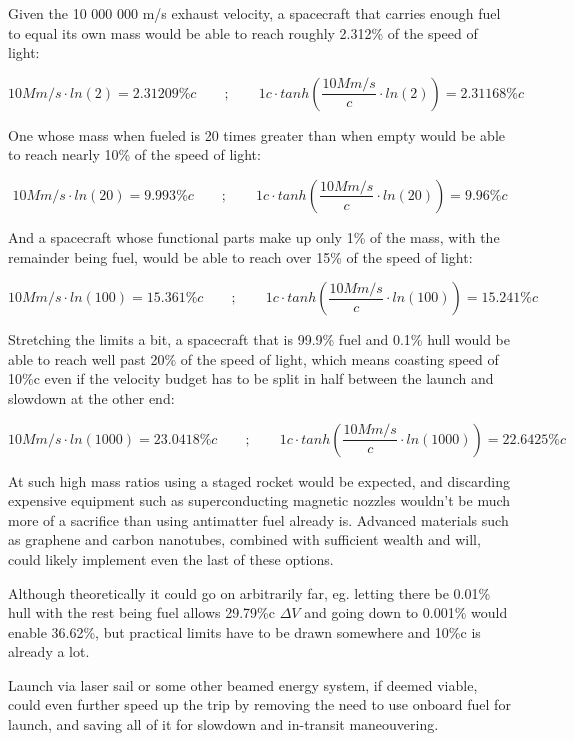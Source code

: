 \documentclass[a4paper]{article}
\begin{document}
    Given the 10 000 000 m/s exhaust velocity, a spacecraft that carries enough fuel to equal its own mass would be able to reach roughly 2.312\% of the speed of light:
    
    $$ 10Mm/s \cdot ln(2) = 2.31209\%c \qquad ; \qquad 1c \cdot tanh\left( \frac{10Mm/s}{c} \cdot ln(2) \right) = 2.31168\%c $$
    
    One whose mass when fueled is 20 times greater than when empty would be able to reach nearly 10\% of the speed of light:
    
    $$ 10Mm/s \cdot ln(20) = 9.993\%c \qquad ; \qquad 1c \cdot tanh\left( \frac{10Mm/s}{c} \cdot ln(20) \right) = 9.96\%c $$
    
    And a spacecraft whose functional parts make up only 1\% of the mass, with the remainder being fuel, would be able to reach over 15\% of the speed of light:
    
    $$ 10Mm/s \cdot ln(100) = 15.361\%c \qquad ; \qquad 1c \cdot tanh\left( \frac{10Mm/s}{c} \cdot ln(100) \right) = 15.241\%c $$
    
    Stretching the limits a bit, a spacecraft that is 99.9\% fuel and 0.1\% hull would be able to reach well past 20\% of the speed of light, which means coasting speed of 10\%c even if the velocity budget has to be split in half between the launch and slowdown at the other end:
    
    $$ 10Mm/s \cdot ln(1000) = 23.0418\%c \qquad ; \qquad 1c \cdot tanh\left( \frac{10Mm/s}{c} \cdot ln(1000) \right) = 22.6425\%c $$
    
    At such high mass ratios using a staged rocket would be expected, and discarding expensive equipment such as superconducting magnetic nozzles wouldn't be much more of a sacrifice than using antimatter fuel already is.
    Advanced materials such as graphene and carbon nanotubes, combined with sufficient wealth and will, could likely implement even the last of these options.
    
    \medskip
    
    Although theoretically it could go on arbitrarily far, eg. letting there be 0.01\% hull with the rest being fuel allows 29.79\%c $\Delta V$ and going down to 0.001\% would enable 36.62\%, but practical limits have to be drawn somewhere and 10\%c is already a lot.
    
    \medskip
    
    Launch via laser sail or some other beamed energy system, if deemed viable, could even further speed up the trip by removing the need to use onboard fuel for launch, and saving all of it for slowdown and in-transit maneouvering.
	
\end{document}
